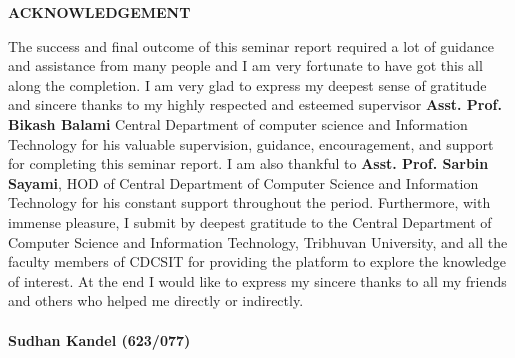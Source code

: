 \documentclass[a4paper, 12pt]{report}
\begin{document}
\begin{center}
\textbf{\LARGE ACKNOWLEDGEMENT}
%
\end{center}
\vspace{20pt}
The success and final outcome of this seminar report required a lot of guidance and assistance from many people and I am very fortunate to have got this all along the completion. I am very glad to express my deepest sense of gratitude and sincere thanks to my highly respected and esteemed supervisor \textbf{Asst. Prof. Bikash Balami} Central Department of computer science and Information Technology for his valuable supervision, guidance, encouragement, and support for completing this seminar report. 
I am also thankful to \textbf{Asst. Prof. Sarbin Sayami}, HOD of Central Department of Computer Science and Information Technology for his constant support throughout the period.
Furthermore, with immense pleasure, I submit by deepest gratitude to the Central Department of Computer Science and Information Technology, Tribhuvan University, and all the faculty members of CDCSIT for providing the platform to explore the knowledge of interest. At the end I would like to express my sincere thanks to all my friends and others who helped me directly or indirectly. \\\\
\vspace{50pt}
\textbf{Sudhan Kandel (623/077) }
\end{document}
